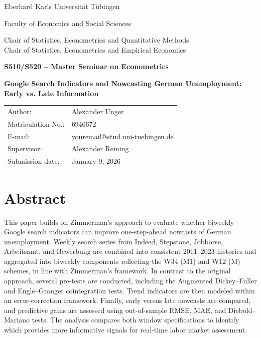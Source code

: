 \documentclass[12pt,a4paper]{article}
\makeatletter
\newcommand{\university}{Eberhard Karls Universität Tübingen}
\newcommand{\faculty}{Faculty of Economics and Social Sciences}
\newcommand{\seminar}{S510/S520 – Master Seminar on Econometrics}
\newcommand{\chairA}{Chair of Statistics, Econometrics and Quantitative Methods}
\newcommand{\chairB}{Chair of Statistics, Econometrics and Empirical Economics}
\newcommand{\supervisor}{Alexander Reining}
\newcommand{\authorname}{Alexander Unger}
\newcommand{\matricno}{6946672}
\newcommand{\emailaddr}{youremail@stud.uni-tuebingen.de}
\newcommand{\thesistitle}{Google Search Indicators and Nowcasting German
Unemployment: Early vs. Late Information}
\newcommand{\submissiondate}{January 9, 2026}
\makeatother
\begin{document}
\begin{titlepage}
  \centering
  {\large \university \par}
  \vspace{2mm}
  {\large \faculty \par}
  \vspace{18mm}
  {\large \chairA\\[2mm]\chairB\par}
  \vspace{18mm}
  {\Large \textbf{\seminar}\par}
  \vspace{18mm}
  {\LARGE \textbf{\thesistitle}\par}
  \vspace{18mm}
  \begin{tabular}{ll}
    Author:      & \authorname \\
    Matriculation No.: & \matricno \\
    E-mail:      & \emailaddr \\
    Supervisor:  & \supervisor \\
    Submission date: & \submissiondate \\
  \end{tabular}
  \vfill
\end{titlepage}


\section*{Abstract}
This paper builds on Zimmerman’s approach to evaluate whether biweekly Google search indicators can improve one-step-ahead nowcasts of German unemployment. Weekly search series from Indeed, Stepstone, Jobbörse, Arbeitsamt, and Bewerbung are combined into consistent 2011–2023 histories and aggregated into biweekly components reflecting the W34 (M1) and W12 (M) schemes, in line with Zimmerman’s framework. In contrast to the original approach, several pre-tests are conducted, including the Augmented Dickey–Fuller and Engle–Granger cointegration tests. Trend indicators are then modeled within an error-correction framework. 
Finally, early versus late nowcasts are compared, and predictive gains are assessed using out-of-sample RMSE, MAE, and Diebold–Mariano tests. 
The analysis compares both window specifications to identify which provides more informative signals for real-time labor market assessment.
\end{document}
